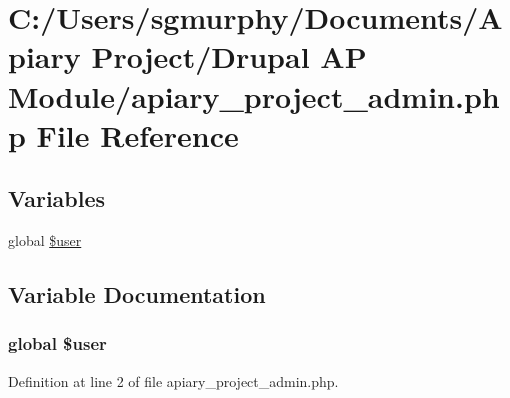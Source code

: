 \hypertarget{apiary__project__admin_8php}{
\section{C:/Users/sgmurphy/Documents/Apiary Project/Drupal AP Module/apiary\_\-project\_\-admin.php File Reference}
\label{apiary__project__admin_8php}
}
\subsection*{Variables}
\begin{DoxyCompactItemize}
\item 
global \hyperlink{apiary__project__admin_8php_a00365e6c5f70c43fb2ed86c9bc5626e0}{\$user}
\end{DoxyCompactItemize}


\subsection{Variable Documentation}
\hypertarget{apiary__project__admin_8php_a00365e6c5f70c43fb2ed86c9bc5626e0}{
\subsubsection[{\$user}]{\setlength{\rightskip}{0pt plus 5cm}global \$user}}
\label{apiary__project__admin_8php_a00365e6c5f70c43fb2ed86c9bc5626e0}


Definition at line 2 of file apiary\_\-project\_\-admin.php.

